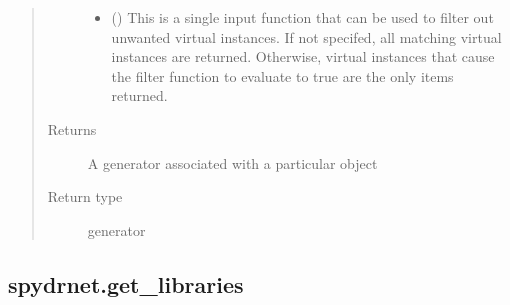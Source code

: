 \documentclass[letterpaper,10pt,english,openany,oneside]{sphinxmanual}
\begin{document}
\begin{fulllineitems}
\begin{quote}
\begin{description}
\begin{itemize}
\item {} 
 () \textendash{} This is a single input function that can be used to filter out unwanted virtual instances. If not specifed, all
matching virtual instances are returned. Otherwise, virtual instances that cause the filter function to evaluate
to true are the only items returned.

\end{itemize}

\item[{Returns}] \leavevmode
{} \textendash{} A generator associated with a particular object

\item[{Return type}] \leavevmode
generator

\end{description}\end{quote}

\end{fulllineitems}



\subsection{spydrnet.get\_libraries}
\label{\detokenize{reference/classes/generated/spydrnet.get_libraries:spydrnet-get-libraries}}\label{\detokenize{reference/classes/generated/spydrnet.get_libraries::doc}}
\end{document}

